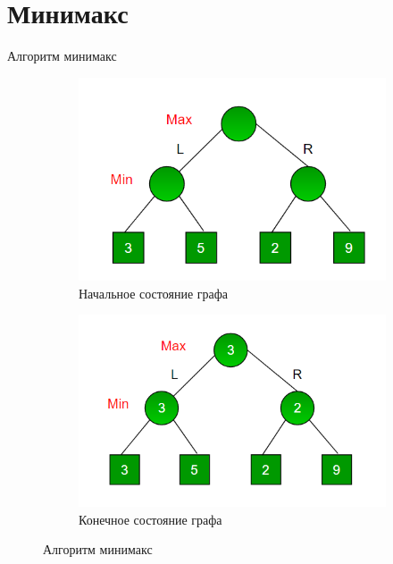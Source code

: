 \documentclass[handout]{beamer}
\begin{document}
	\section{Минимакс}
    \begin{frame}{Алгоритм минимакс}
		\begin{figure}[h!]
			\centering
			\begin{subfigure}[b]{0.49\linewidth}
				\includegraphics[width=1\linewidth]{minmax.png}
				\caption{Начальное состояние графа}
			\end{subfigure}
			\begin{subfigure}[b]{0.49\linewidth}
				\includegraphics[width=1\linewidth]{minmax1.png}
				\caption{Конечное состояние графа}
			\end{subfigure}
		  \caption{Алгоритм минимакс}
		\end{figure}
    \end{frame}	
\end{document}
